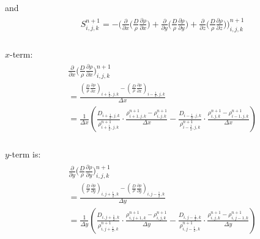 \documentclass{article}
\numberwithin{equation}{subsection}
\begin{document}
and
\begin{align}
\begin{split}
& S^{n+1}_{i,j,k} = - \Bigg( \frac{\partial}{\partial x} \Big( \frac{D}{\rho}\frac{\partial \rho}{\partial x} \Big)
		      + \frac{\partial}{\partial y} \Big( \frac{D}{\rho}\frac{\partial \rho}{\partial y} \Big) 
		      + \frac{\partial}{\partial z} \Big( \frac{D}{\rho}\frac{\partial \rho}{\partial z} \Big) \Bigg)^{n+1}_{i,j,k} \\
\end{split}
\end{align}



$x$-term:
\begin{align}
\begin{split}
& \frac{\partial}{\partial x} \Big( \frac{D}{\rho}\frac{\partial \rho}{\partial x} \Big)^{n+1}_{i,j,k} \\
&= \frac{(\frac{D}{\rho}\frac{\partial \rho}{\partial x})_{i+\frac{1}{2},j,k} - (\frac{D}{\rho}\frac{\partial \rho}{\partial x})_{i-\frac{1}{2},j,k}}{\Delta x} \\
& = \frac{1}{\Delta x} ( \frac{D_{i+\frac{1}{2},j,k}}{\rho^{n+1}_{i+\frac{1}{2},j,k}}\cdot \frac{\rho^{n+1}_{i+1,j,k} - \rho^{n+1}_{i,j,k}}{\Delta x}
- \frac{D_{i-\frac{1}{2},j,k}}{\rho^{n+1}_{i-\frac{1}{2},j,k}}\cdot \frac{\rho^{n+1}_{i,j,k} - \rho^{n+1}_{i-1,j,k}}{\Delta x})   \\
\end{split}
\end{align}


$y$-term is:
\begin{align}
\begin{split}
& \frac{\partial}{\partial y} \Big( \frac{D}{\rho}\frac{\partial \rho}{\partial y} \Big)^{n+1}_{i,j,k} \\
&= \frac{ (\frac{D}{\rho}\frac{\partial \rho}{\partial y})_{i,j+\frac{1}{2},k} - (\frac{D}{\rho}\frac{\partial \rho}{\partial y})_{i,j-\frac{1}{2},k} }{\Delta y} \\
& = \frac{1}{\Delta y}(\frac{D_{i,j+\frac{1}{2},k}}{\rho^{n+1}_{i,j+\frac{1}{2},k}}\cdot \frac{\rho^{n+1}_{i,j+1,k} - \rho^{n+1}_{i,j,k}}{\Delta y} 
- \frac{D_{i,j-\frac{1}{2},k}}{\rho^{n+1}_{i,j-\frac{1}{2},k}}\cdot \frac{\rho^{n+1}_{i,j,k} - \rho^{n+1}_{i,j-1,k}}{\Delta y})    \\
\end{split}
\end{align}
\end{document}
